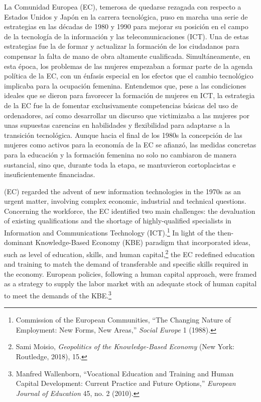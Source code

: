 \documentclass{tufte-handout}
\begin{document}
La Comunidad Europea (EC), temerosa de quedarse rezagada con respecto a Estados Unidos y Japón en la carrera tecnológica, puso en marcha una serie de estrategias en las décadas de 1980 y 1990 para mejorar su posición en el campo de la tecnología de la información y las telecomunicaciones (ICT). Una de estas estrategias fue la de formar y actualizar la formación de los ciudadanos para compensar la falta de mano de obra altamente cualificada. Simultáneamente, en esta época, los problemas de las mujeres empezaban a formar parte de la agenda política de la EC, con un énfasis especial en los efectos que el cambio tecnológico implicaba para la ocupación femenina. Entendemos que, pese a las condiciones ideales que se dieron para favorecer la formación de mujeres en ICT, la estrategia de la EC fue la de fomentar exclusivamente competencias básicas del uso de ordenadores, así como desarrollar un discurso que victimizaba a las mujeres por unas supuestas carencias en habilidades y flexibilidad para adaptarse a la transición tecnológica. Aunque hacia el final de los 1980s la concepción de las mujeres como activos para la economía de la EC se afianzó, las medidas concretas para la educación y la formación femenina no solo no cambiaron de manera sustancial, sino que, durante toda la etapa, se mantuvieron cortoplacistas e insuficientemente financiadas.

\vspace*{2em}

 (EC) regarded the advent of new information
technologies in the 1970s as an urgent matter, involving complex
economic, industrial and technical questions. Concerning the workforce,
the EC identified two main challenges: the devaluation of existing
qualifications and the shortage of highly-qualified specialists in
Information and Communications Technology (ICT).\footnote{Commission of
  the European Communities, ``The Changing Nature of Employment: New
  Forms, New Areas,'' \emph{Social Europe} 1 (1988).} In light of the
then-dominant Knowledge-Based Economy (KBE) paradigm that incorporated
ideas, such as level of education, skills, and human capital,\footnote{Sami
  Moisio, \emph{Geopolitics of the Knowledge-Based Economy} (New York:
  Routledge, 2018), 15.} the EC redefined education and training to
match the demand of transferable and specific skills required in the
economy. European policies, following a human capital approach, were
framed as a strategy to supply the labor market with an adequate stock
of human capital to meet the demands of the KBE.\footnote{Manfred
  Wallenborn, ``Vocational Education and Training and Human Capital
  Development: Current Practice and Future Options,'' \emph{European
  Journal of Education} 45, no. 2 (2010).}
\end{document}
